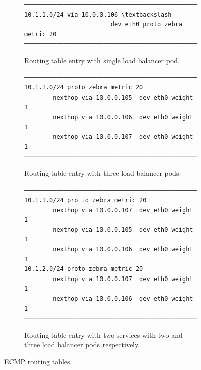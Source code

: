 \begin{figure}[h]

\begin{subfigure}[t]{\columnwidth}
\centering
\begin{Verbatim}[commandchars=\\\{\}]
───────────────────────────────────────────────────────
10.1.1.0/24 via 10.0.0.106 \textbackslash 
                        dev eth0 proto zebra metric 20
───────────────────────────────────────────────────────
\end{Verbatim}
\caption{Routing table entry with single load balancer pod.}
\label{fig:single}
\end{subfigure}
\par\bigskip

\begin{subfigure}[t]{\columnwidth}
\centering
\begin{Verbatim}[commandchars=\\\{\}]
───────────────────────────────────────────────────────
10.1.1.0/24 proto zebra metric 20
        nexthop via 10.0.0.105  dev eth0 weight 1
        nexthop via 10.0.0.106  dev eth0 weight 1
        nexthop via 10.0.0.107  dev eth0 weight 1
───────────────────────────────────────────────────────
\end{Verbatim}
\caption{Routing table entry with three load balancer pods.}
\label{fig:three}
\end{subfigure}
\par\bigskip

\begin{subfigure}[t]{\columnwidth}
\centering
\begin{Verbatim}[commandchars=\\\{\}]
───────────────────────────────────────────────────────
10.1.1.0/24 pro to zebra metric 20
        nexthop via 10.0.0.107  dev eth0 weight 1
        nexthop via 10.0.0.105  dev eth0 weight 1
        nexthop via 10.0.0.106  dev eth0 weight 1
10.1.2.0/24 proto zebra metric 20
        nexthop via 10.0.0.107  dev eth0 weight 1
        nexthop via 10.0.0.106  dev eth0 weight 1
───────────────────────────────────────────────────────
\end{Verbatim}
\caption{Routing table entry with two services with two and three load balancer pods respectively.}
\label{fig:double_svc}
\end{subfigure}
\par\bigskip

\caption{ECMP routing tables.}
\label{fig:exabgp_routing_table}
\end{figure}

